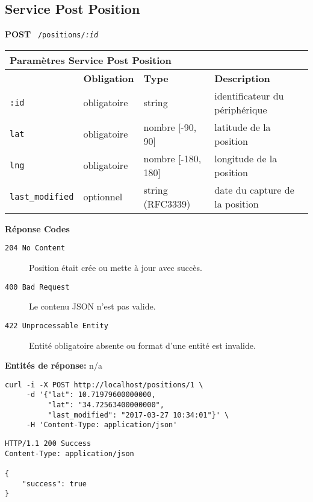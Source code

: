 \subsection{Service Post Position}
\label{appendix:sprint1-position-post-doc}

\textbf{POST} \ \texttt{/positions/\textit{:id}}

\begin{table}[htbp]
    \centering
    \begin{tabularx}{\textwidth}{@{}llll@{}}
        \multicolumn{4}{X}{\textbf{Paramètres Service Post Position}} \\
        \toprule
        \rowcolor{gray!20}
        \multicolumn{1}{l}{\textbf{Élément}} &
        \multicolumn{1}{l}{\textbf{Obligation}} &
        \multicolumn{1}{l}{\textbf{Type}} &
        \multicolumn{1}{l}{\textbf{Description}} \\
        \midrule
        \verb|:id| & obligatoire & string & identificateur du périphérique \\
        \verb|lat| & obligatoire & nombre [-90, 90] & latitude de la position \\
        \verb|lng| & obligatoire & nombre [-180, 180] & longitude de la position \\
        \verb|last_modified| & optionnel & string (RFC3339) & date du capture de la position \\
        \bottomrule
    \end{tabularx}
\end{table}

\textbf{Réponse Codes}

\begin{description}
    \item[\texttt{204 No Content}] Position était crée ou mette à jour avec succès.
    \item[\texttt{400 Bad Request}] Le contenu JSON n'est pas valide.
    \item[\texttt{422 Unprocessable Entity}] Entité obligatoire absente ou format d'une entité est invalide.
\end{description}

\textbf{Entités de réponse:} n/a

\begin{listing}[H]
    \begin{verbatim}
curl -i -X POST http://localhost/positions/1 \
     -d '{"lat": 10.71979600000000,
          "lat": "34.72563400000000",
          "last_modified": "2017-03-27 10:34:01"}' \
     -H 'Content-Type: application/json'
\end{verbatim}
\begin{verbatim}
HTTP/1.1 200 Success
Content-Type: application/json

{
    "success": true
}
\end{verbatim}
\end{listing}
